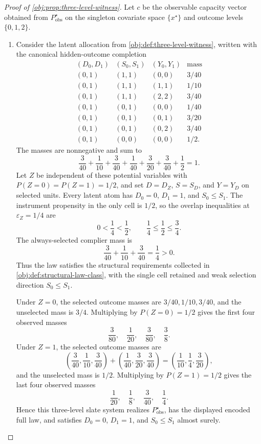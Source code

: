 \begin{proof}[Proof of \cref{obj:prop:three-level-witness}]
Let \(c\) be the observable capacity vector obtained from \(P_{\mathrm{obs}}^{\star}\) on the singleton covariate space \(\{x^{\star}\}\) and outcome levels \(\{0,1,2\}\).

\begin{enumerate}
\item Consider the latent allocation from \cref{obj:def:three-level-witness}, written with the canonical hidden-outcome completion
\[
\begin{array}{c|c|c|c}
(D_0,D_1) & (S_0,S_1) & (Y_0,Y_1) & \text{mass}\\ \hline
(0,1)&(1,1)&(0,0)&3/40\\
(0,1)&(1,1)&(1,1)&1/10\\
(0,1)&(1,1)&(2,2)&3/40\\
(0,1)&(0,1)&(0,0)&1/40\\
(0,1)&(0,1)&(0,1)&3/20\\
(0,1)&(0,1)&(0,2)&3/40\\
(0,1)&(0,0)&(0,0)&1/2 .
\end{array}
\]
The masses are nonnegative and sum to
\[
\frac{3}{40}+\frac{1}{10}+\frac{3}{40}
+\frac{1}{40}+\frac{3}{20}+\frac{3}{40}
+\frac12
=
1.
\]
Let \(Z\) be independent of these potential variables with
\(P(Z=0)=P(Z=1)=1/2\), and set \(D=D_Z\), \(S=S_D\), and \(Y=Y_D\) on selected units.  Every latent atom has \(D_0=0\), \(D_1=1\), and \(S_0\le S_1\).  The instrument propensity in the only cell is \(1/2\), so the overlap inequalities at \(\varepsilon_Z=1/4\) are
\[
0<\frac14<\frac12,
\qquad
\frac14\le \frac12\le \frac34 .
\]
The always-selected complier mass is
\[
\frac{3}{40}+\frac{1}{10}+\frac{3}{40}=\frac14>0.
\]
Thus the law satisfies the structural requirements collected in \cref{obj:def:structural-law-class}, with the single cell retained and weak selection direction \(S_0\le S_1\).

Under \(Z=0\), the selected outcome masses are \(3/40,1/10,3/40\), and the unselected mass is \(3/4\).  Multiplying by \(P(Z=0)=1/2\) gives the first four observed masses
\[
\frac{3}{80},\quad \frac{1}{20},\quad \frac{3}{80},\quad \frac38 .
\]
Under \(Z=1\), the selected outcome masses are
\[
\left(\frac{3}{40},\frac{1}{10},\frac{3}{40}\right)
+
\left(\frac{1}{40},\frac{3}{20},\frac{3}{40}\right)
=
\left(\frac{1}{10},\frac14,\frac{3}{20}\right),
\]
and the unselected mass is \(1/2\).  Multiplying by \(P(Z=1)=1/2\) gives the last four observed masses
\[
\frac{1}{20},\quad \frac18,\quad \frac{3}{40},\quad \frac14 .
\]
Hence this three-level slate system realizes \(P_{\mathrm{obs}}^{\star}\), has the displayed encoded full law, and satisfies \(D_0=0\), \(D_1=1\), and \(S_0\le S_1\) almost surely. %


\end{enumerate}
\end{proof}
